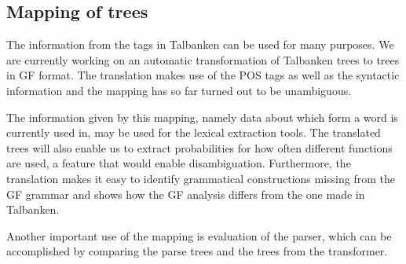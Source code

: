\documentclass[submission]{eptcs} %
\begin{document}
\subsection{Mapping of trees}
The information from the tags in Talbanken can be used for many purposes.
We are currently working on an automatic transformation of Talbanken trees 
to trees in GF format. The translation makes use of the POS tags as well as
the syntactic information and the mapping has so far turned out to be unambiguous. 

The information given by this mapping, namely data about which form a word is
currently used in, may be used for the lexical extraction
tools.%
The translated trees will also enable us to extract probabilities for how often
different functions are used, a feature that would enable disambiguation.
Furthermore, the translation makes it easy to identify grammatical constructions
missing from the GF grammar and shows how the GF analysis differs from the one made
in Talbanken.

Another important use of the mapping is evaluation of the parser, which can be
accomplished by comparing the parse trees and the trees from the transformer.

\end{document}

